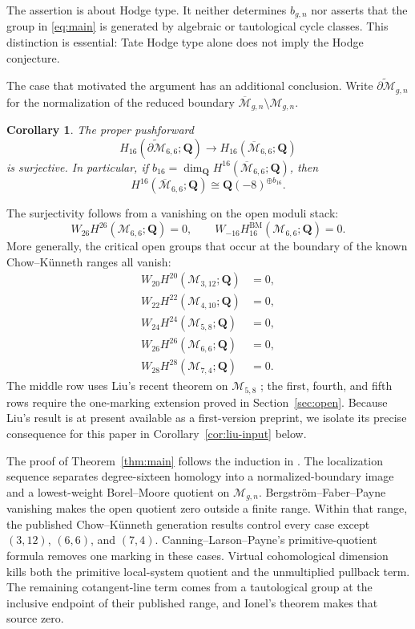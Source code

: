 \documentclass[12pt,reqno]{amsart}
\newcommand{\Q}{\mathbf{Q}}
\newcommand{\M}{\mathcal{M}}
\newcommand{\Mbar}{\overline{\mathcal{M}}}
\newcommand{\BM}{\mathrm{BM}}
\newtheorem{corollary}[theorem]{Corollary}
\theoremstyle{definition}
\theoremstyle{remark}
\begin{document}
The assertion is about Hodge type.  It neither determines $b_{g,n}$ nor
asserts that the group in \eqref{eq:main} is generated by algebraic or
tautological cycle classes.  This distinction is essential: Tate Hodge type
alone does not imply the Hodge conjecture.

The case that motivated the argument has an additional conclusion.  Write
$\widetilde{\partial\M}_{g,n}$ for the normalization of the reduced boundary
$\Mbar_{g,n}\setminus\M_{g,n}$.

\begin{corollary}\label{cor:66-intro}
The proper pushforward
\begin{equation}\label{eq:66-boundary-surj-intro}
 H_{16}(\widetilde{\partial\M}_{6,6};\Q)
 \longrightarrow H_{16}(\Mbar_{6,6};\Q)
\end{equation}
is surjective.  In particular, if
$b_{16}=\dim_{\Q}H^{16}(\Mbar_{6,6};\Q)$, then
\[
 H^{16}(\Mbar_{6,6};\Q)\cong\Q(-8)^{\oplus b_{16}}.
\]
\end{corollary}

The surjectivity follows from a vanishing on the open moduli stack:
\begin{equation}\label{eq:66-open-intro}
 W_{26}H^{26}(\M_{6,6};\Q)=0,
 \qquad
 W_{-16}H^{\BM}_{16}(\M_{6,6};\Q)=0.
\end{equation}
More generally, the critical open groups that occur at the boundary of the
known Chow--K\"unneth ranges all vanish:
\begin{equation}\label{eq:critical-intro}
\begin{split}
 W_{20}H^{20}(\M_{3,12};\Q)&=0,\\
 W_{22}H^{22}(\M_{4,10};\Q)&=0,\\
 W_{24}H^{24}(\M_{5,8};\Q)&=0,\\
 W_{26}H^{26}(\M_{6,6};\Q)&=0,\\
 W_{28}H^{28}(\M_{7,4};\Q)&=0.
\end{split}
\end{equation}
The middle row uses Liu's recent theorem on $\M_{5,8}$
\cite[Corollary~3.9]{Liu}; the first, fourth, and fifth rows require the
one-marking extension proved in Section~\ref{sec:open}.  Because Liu's
result is at present available as a first-version preprint, we isolate its
precise consequence for this paper in Corollary~\ref{cor:liu-input} below.

The proof of Theorem~\ref{thm:main} follows the induction in
\cite[Section~6.2]{CLP}.  The localization sequence separates degree-sixteen
homology into a normalized-boundary image and a lowest-weight Borel--Moore
quotient on $\M_{g,n}$.  Bergstr\"om--Faber--Payne vanishing makes the open
quotient zero outside a finite range.  Within that range, the published
Chow--K\"unneth generation results control every case except
$(3,12)$, $(6,6)$, and $(7,4)$.  Canning--Larson--Payne's
primitive-quotient formula removes one marking in these cases.  Virtual
cohomological dimension kills both the primitive local-system quotient and
the unmultiplied pullback term.  The remaining cotangent-line term comes
from a tautological group at the inclusive endpoint of their published
range, and Ionel's theorem makes that source zero.
\end{document}
